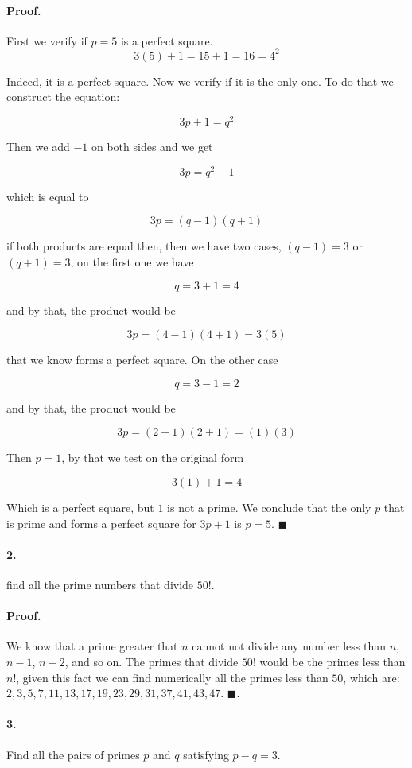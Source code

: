 \documentclass{article}
\begin{document}
\paragraph{Proof.} First we verify if $p=5$ is a perfect square.
$$3(5) + 1 = 15 + 1 = 16 = 4^2$$

Indeed, it is a perfect square. Now we verify if it is the only one. To do that we construct the equation:

$$3p + 1 = q^2$$

Then we add $-1$ on both sides and we get

$$3p = q^2 - 1$$

which is equal to

$$3p = (q - 1) (q + 1)$$

if both products are equal then, then we have two cases, $(q - 1) = 3$ or $(q + 1) = 3$, on the first one we have

$$q = 3 + 1 = 4$$

and by that, the product would be

$$3p = (4 - 1)(4 +1) = 3(5)$$

that we know forms a perfect square. On the other case

$$q = 3 - 1 = 2$$

and by that, the product would be

$$3p = (2 - 1)(2 +1) = (1)(3)$$

Then $p=1$, by that we test on the original form

$$3(1) + 1 = 4$$

Which is a perfect square, but $1$ is not a prime. We conclude that the only $p$ that is prime and forms a perfect square for $3p + 1$ is $p = 5$. $\blacksquare$

\paragraph{2.} find all the prime numbers that divide $50!$.

\paragraph{Proof.} We know that a prime greater that $n$ cannot not divide any number less than $n$, $n-1$, $n-2$, and so on. The primes that divide $50!$ would be the primes less than $n!$, given this fact we can find numerically all the primes less than $50$, which are: $2, 3, 5, 7, 11, 13, 17, 19, 23, 29, 31, 37, 41, 43, 47$. $\blacksquare$.

\paragraph{3.} Find all the pairs of primes $p$ and $q$ satisfying $p - q = 3$.
\end{document}
